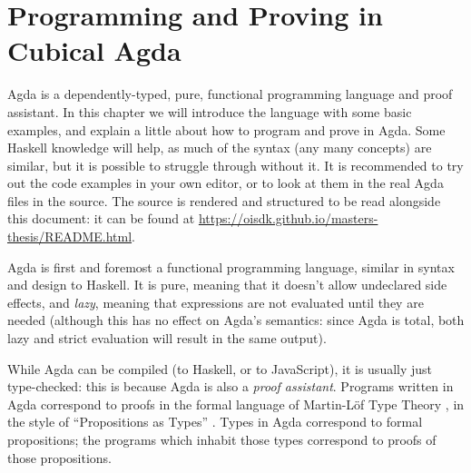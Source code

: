 \chapter{Programming and Proving in Cubical Agda} \label{agda-intro} Agda \citep{norellDependentlyTypedProgramming2008} is a dependently-typed, pure,
functional programming language and proof assistant.
In this chapter we will introduce the language with some basic examples, and
explain a little about how to program and prove in Agda.
Some Haskell knowledge will help, as much of the syntax (any many concepts) are
similar, but it is possible to struggle through without it.
It is recommended to try out the code examples in your own editor, or to look at
them in the real Agda files in the source.
The source is rendered and structured to be read alongside this document: it can
be found at \mbox{\url{https://oisdk.github.io/masters-thesis/README.html}}.

Agda is first and foremost a functional programming language, similar in syntax
and design to Haskell.
It is pure, meaning that it doesn't allow undeclared side effects, and
\emph{lazy}, meaning that expressions are not evaluated until they are needed
(although this has no effect on Agda's semantics: since Agda is total, both lazy
and strict evaluation will result in the same output).

While Agda can be compiled (to Haskell, or to JavaScript), it is usually just
type-checked: this is because Agda is also a \emph{proof assistant}.
Programs written in Agda correspond to proofs in the formal language of
Martin-Löf Type Theory \citep{martin-lofIntuitionisticTypeTheory1980}, in the
style of ``Propositions as Types'' \citep{wadlerPropositionsTypes2015}.
Types in Agda correspond to formal propositions; the programs which inhabit
those types correspond to proofs of those propositions.
\begin{figure}
  \centering
\end{figure}
